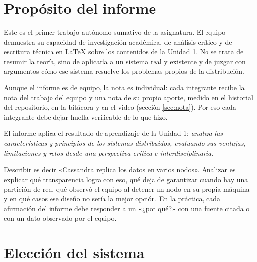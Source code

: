 \documentclass[11pt,a4paper]{article}
\begin{document}
\section{Propósito del informe}

Este es el primer trabajo autónomo sumativo de la asignatura. El equipo demuestra su capacidad de investigación académica, de análisis crítico y de escritura técnica en \LaTeX{} sobre los contenidos de la Unidad 1. No se trata de resumir la teoría, sino de aplicarla a un sistema real y existente y de juzgar con argumentos cómo ese sistema resuelve los problemas propios de la distribución.

Aunque el informe es de equipo, la nota es individual: cada integrante recibe la nota del trabajo del equipo y una nota de su propio aporte, medido en el historial del repositorio, en la bitácora y en el video (sección \ref{sec:nota}). Por eso cada integrante debe dejar huella verificable de lo que hizo.

El informe aplica el resultado de aprendizaje de la Unidad 1: \emph{analiza las características y principios de los sistemas distribuidos, evaluando sus ventajas, limitaciones y retos desde una perspectiva crítica e interdisciplinaria}.

\begin{infoBox}[title={Lo que distingue un análisis de una descripción}]
	Describir es decir «Cassandra replica los datos en varios nodos». Analizar es explicar qué transparencia logra con eso, qué deja de garantizar cuando hay una partición de red, qué observó el equipo al detener un nodo en su propia máquina y en qué casos ese diseño no sería la mejor opción. En la práctica, cada afirmación del informe debe responder a un «¿por qué?» con una fuente citada o con un dato observado por el equipo.
\end{infoBox}

\section{Elección del sistema}\label{sec:eleccion}
\end{document}
